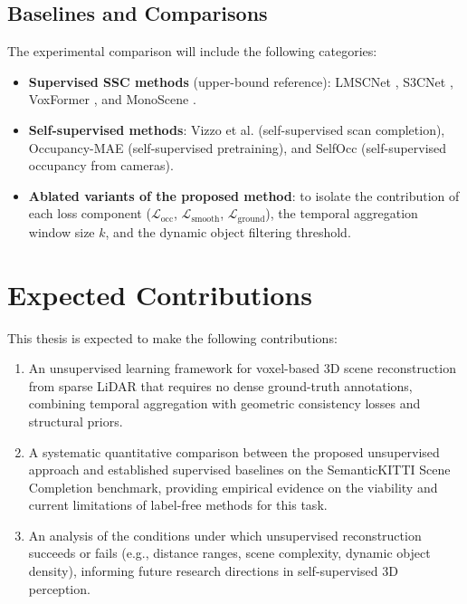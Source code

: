 \documentclass[a4paper, 12pt]{article}
\begin{document}
	\subsection{Baselines and Comparisons}
	
	The experimental comparison will include the following categories:
	
	\begin{itemize}
		\item \textbf{Supervised SSC methods} (upper-bound reference): LMSCNet
		\cite{9320442}, S3CNet \cite{pmlr-v155-cheng21a}, VoxFormer
		\cite{Li_2023_CVPR}, and MonoScene \cite{Cao_2022_CVPR}.
		\item \textbf{Self-supervised methods}: Vizzo et al. \cite{9812507}
		(self-supervised scan completion), Occupancy-MAE \cite{10273603}
		(self-supervised pretraining), and SelfOcc \cite{Huang_2024_CVPR}
		(self-supervised occupancy from cameras).
		\item \textbf{Ablated variants of the proposed method}: to isolate the
		contribution of each loss component ($\mathcal{L}_{\text{occ}}$,
		$\mathcal{L}_{\text{smooth}}$, $\mathcal{L}_{\text{ground}}$), the
		temporal aggregation window size $k$, and the dynamic object filtering
		threshold.
	\end{itemize}
	
	\section{Expected Contributions}
	
	This thesis is expected to make the following contributions:
	
	\begin{enumerate}
		\item An unsupervised learning framework for voxel-based 3D scene
		reconstruction from sparse LiDAR that requires no dense ground-truth
		annotations, combining temporal aggregation with geometric consistency
		losses and structural priors.
		\item A systematic quantitative comparison between the proposed unsupervised
		approach and established supervised baselines on the SemanticKITTI Scene
		Completion benchmark, providing empirical evidence on the viability and
		current limitations of label-free methods for this task.
		\item An analysis of the conditions under which unsupervised reconstruction
		succeeds or fails (e.g., distance ranges, scene complexity, dynamic
		object density), informing future research directions in self-supervised
		3D perception.
	\end{enumerate}
	
\end{document}
